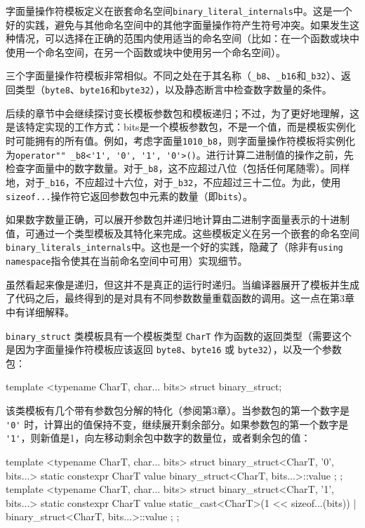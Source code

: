 字面量操作符模板定义在嵌套命名空间\verb|binary_literal_internals|中。这是一个好的实践，避免与其他命名空间中的其他字面量操作符产生符号冲突。如果发生这种情况，可以选择在正确的范围内使用适当的命名空间（比如：在一个函数或块中使用一个命名空间，在另一个函数或块中使用另一个命名空间）。

三个字面量操作符模板非常相似。不同之处在于其名称（\verb|_b8|、\verb|_b16|和\verb|_b32|）、返回类型（\verb|byte8|、\verb|byte16|和\verb|byte32|），以及静态断言中检查数字数量的条件。

后续的章节中会继续探讨变长模板参数包和模板递归；不过，为了更好地理解，这是该特定实现的工作方式：bits是一个模板参数包，不是一个值，而是模板实例化时可能拥有的所有值。例如，考虑字面量\verb|1010_b8|，则字面量操作符模板将实例化为\verb|operator"" _b8<'1', '0', '1', '0'>()|。进行计算二进制值的操作之前，先检查字面量中的数字数量。对于\verb|_b8|，这不应超过八位（包括任何尾随零）。同样地，对于\verb|_b16|，不应超过十六位，对于\verb|_b32|，不应超过三十二位。为此，使用\verb|sizeof...|操作符它返回参数包中元素的数量（即\verb|bits|）。

如果数字数量正确，可以展开参数包并递归地计算由二进制字面量表示的十进制值，可通过一个类型模板及其特化来完成。这些模板定义在另一个嵌套的命名空间\verb|binary_literals_internals|中。这也是一个好的实践，隐藏了（除非有\verb|using namespace|指令使其在当前命名空间中可用）实现细节。

\begin{myNotic}
虽然看起来像是递归，但这并不是真正的运行时递归。当编译器展开了模板并生成了代码之后，最终得到的是对具有不同参数数量重载函数的调用。这一点在第3章中有详细解释。
\end{myNotic}

\verb|binary_struct| 类模板具有一个模板类型 \verb|CharT| 作为函数的返回类型（需要这个是因为字面量操作符模板应该返回 \verb|byte8|、\verb|byte16| 或 \verb|byte32|），以及一个参数包：

\begin{cpp}
template <typename CharT, char... bits>
struct binary_struct;
\end{cpp}

该类模板有几个带有参数包分解的特化（参阅第3章）。当参数包的第一个数字是 \verb|'0'| 时，计算出的值保持不变，继续展开剩余部分。如果参数包的第一个数字是 \verb|'1'|，则新值是1，向左移动剩余包中数字的数量位，或者剩余包的值：

\begin{cpp}
template <typename CharT, char... bits>
struct binary_struct<CharT, '0', bits...>
{
    static constexpr CharT value{ binary_struct<CharT, bits...>::value };
};
template <typename CharT, char... bits>
struct binary_struct<CharT, '1', bits...>
{
    static constexpr CharT value{
        static_cast<CharT>(1 << sizeof...(bits)) |
        binary_struct<CharT, bits...>::value };
};
\end{cpp}

